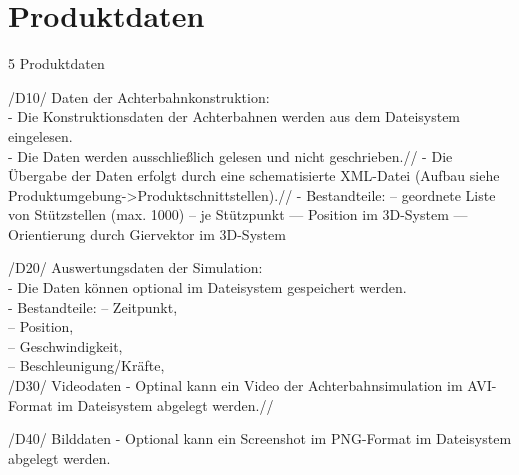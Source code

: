 
\chapter{Produktdaten}
5  Produktdaten

/D10/ Daten der Achterbahnkonstruktion:\\
-  Die Konstruktionsdaten der Achterbahnen werden aus dem Dateisystem eingelesen.\\
-  Die Daten werden ausschließlich gelesen und nicht geschrieben.//
-  Die Übergabe der Daten erfolgt durch eine schematisierte XML-Datei (Aufbau siehe Produktumgebung->Produktschnittstellen).//
-  Bestandteile:
--  geordnete Liste von Stützstellen (max. 1000)
--  je Stützpunkt
---  Position im 3D-System
---  Orientierung durch Giervektor im 3D-System

/D20/ Auswertungsdaten der Simulation:\\
-  Die Daten können optional im Dateisystem gespeichert werden.\\
-  Bestandteile:
--  Zeitpunkt,\\
--  Position,\\
--  Geschwindigkeit,\\
--  Beschleunigung/Kräfte,\\

/D30/ Videodaten
-  Optinal kann ein Video der Achterbahnsimulation im AVI-Format im Dateisystem abgelegt werden.//

/D40/ Bilddaten
-  Optional kann ein Screenshot im PNG-Format im Dateisystem abgelegt werden.
